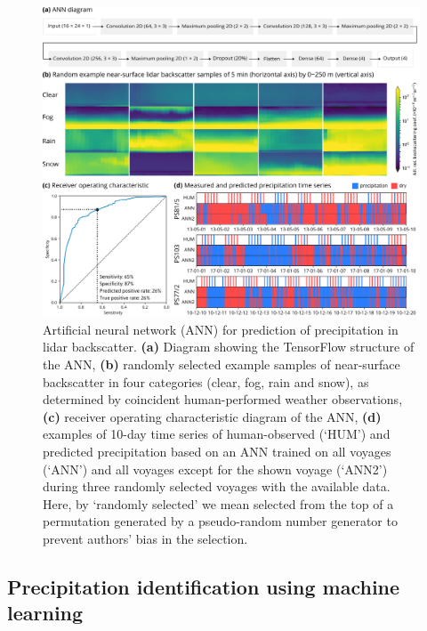 \documentclass[12pt,a4paper]{article}
\begin{document}
\begin{figure}[b!]
\centering
\includegraphics[width=\textwidth]{img/ann.pdf}
\caption{
Artificial neural network (ANN) for prediction of precipitation in lidar
backscatter. \textbf{(a)} Diagram showing the TensorFlow structure of the ANN,
\textbf{(b)} randomly selected example samples of near-surface backscatter in
four categories (clear, fog, rain and snow), as determined by coincident
human-performed weather observations, \textbf{(c)} receiver operating
characteristic diagram of the ANN, \textbf{(d)} examples of 10-day time series
of human-observed (`HUM') and predicted precipitation based on an ANN trained
on all voyages (`ANN') and all voyages except for the shown voyage (`ANN2')
during three randomly selected voyages with the available data. Here, by
`randomly selected' we mean selected from the top of a permutation generated by
a pseudo-random number generator to prevent authors' bias in the selection.
}
\label{fig:ann}
\end{figure}

\subsection{Precipitation identification using machine learning}
\label{sec:ann}
\end{document}
